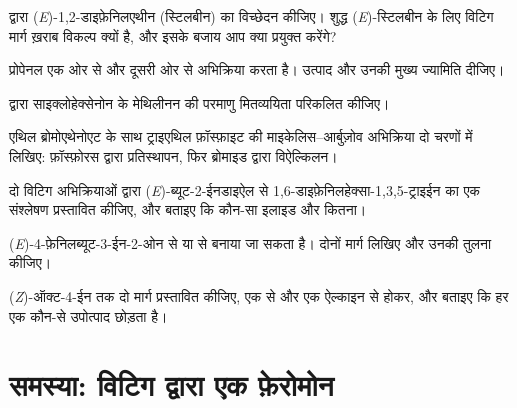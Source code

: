 \begin{exercise}[$\star\star$]\label{exo:b2:wittig:6}
 द्वारा (\textit{E})-1,2-डाइफ़ेनिलएथीन (स्टिलबीन) का विच्छेदन कीजिए। शुद्ध (\textit{E})-स्टिलबीन के लिए विटिग मार्ग
ख़राब विकल्प क्यों है, और इसके बजाय आप क्या प्रयुक्त करेंगे?
\end{exercise}

\begin{exercise}[$\star\star$]\label{exo:b2:wittig:7}
प्रोपेनल एक ओर  से और दूसरी ओर  से अभिक्रिया करता है। उत्पाद और
उनकी मुख्य ज्यामिति दीजिए।
\end{exercise}

\begin{exercise}[$\star\star$]\label{exo:b2:wittig:8}
 द्वारा साइक्लोहेक्सेनोन के मेथिलीनन की परमाणु मितव्ययिता परिकलित कीजिए।
\end{exercise}

\begin{exercise}[$\star\star$]\label{exo:b2:wittig:9}
एथिल ब्रोमोएथेनोएट के साथ ट्राइएथिल फ़ॉस्फ़ाइट की माइकेलिस--आर्बुज़ोव अभिक्रिया दो चरणों में लिखिए:
फ़ॉस्फ़ोरस द्वारा प्रतिस्थापन, फिर ब्रोमाइड द्वारा विऐल्किलन।
\end{exercise}

\begin{exercise}[$\star\star\star$]\label{exo:b2:wittig:10}
दो विटिग अभिक्रियाओं द्वारा (\textit{E})-ब्यूट-2-ईनडाइऐल
 से 1,6-डाइफ़ेनिलहेक्सा-1,3,5-ट्राइईन का एक संश्लेषण प्रस्तावित कीजिए, और बताइए कि कौन-सा इलाइड और कितना।
\end{exercise}

\begin{exercise}[$\star\star\star$]\label{exo:b2:wittig:11}
(\textit{E})-4-फ़ेनिलब्यूट-3-ईन-2-ओन  से या  से बनाया जा सकता है।
दोनों मार्ग लिखिए और उनकी तुलना कीजिए।
\end{exercise}

\begin{exercise}[$\star\star\star$]\label{exo:b2:wittig:12}
(\textit{Z})-ऑक्ट-4-ईन तक दो मार्ग प्रस्तावित कीजिए, एक  से और एक ऐल्काइन से होकर,
और बताइए कि हर एक कौन-से उपोत्पाद छोड़ता है।
\end{exercise}

\section{समस्या: विटिग द्वारा एक फ़ेरोमोन}

